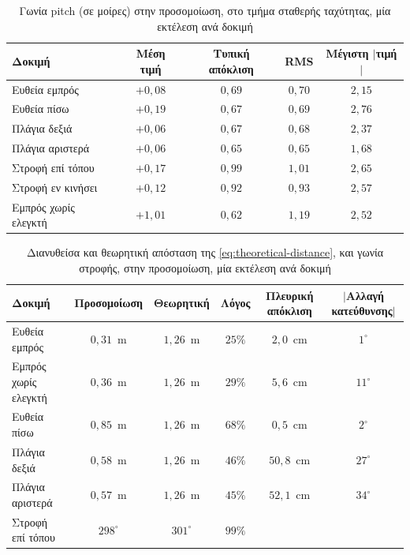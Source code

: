 \documentclass[11pt]{report}
\begin{document}
\begin{table}[htbp]
    \centering
    \small
    \begin{tabular}{@{}l c c c c@{}}
        \toprule
        Δοκιμή & Μέση τιμή & Τυπική απόκλιση & RMS & Μέγιστη $|$τιμή$|$ \\
        \midrule
        Ευθεία εμπρός & $+0{,}08$ & $0{,}69$ & $0{,}70$ & $2{,}15$ \\
        Ευθεία πίσω & $+0{,}19$ & $0{,}67$ & $0{,}69$ & $2{,}76$ \\
        Πλάγια δεξιά & $+0{,}06$ & $0{,}67$ & $0{,}68$ & $2{,}37$ \\
        Πλάγια αριστερά & $+0{,}06$ & $0{,}65$ & $0{,}65$ & $1{,}68$ \\
        Στροφή επί τόπου & $+0{,}17$ & $0{,}99$ & $1{,}01$ & $2{,}65$ \\
        Στροφή εν κινήσει & $+0{,}12$ & $0{,}92$ & $0{,}93$ & $2{,}57$ \\
        Εμπρός χωρίς ελεγκτή & $+1{,}01$ & $0{,}62$ & $1{,}19$ & $2{,}52$ \\
        \bottomrule
    \end{tabular}
    \caption[Γωνία pitch στην προσομοίωση]{Γωνία pitch (σε μοίρες) στην
    προσομοίωση, στο τμήμα σταθερής ταχύτητας, μία εκτέλεση ανά δοκιμή}
    \label{tab:sim-pitch}
\end{table}

\begin{table}[htbp]
    \centering
    \small
    \begin{tabular}{@{}l c c c c c@{}}
        \toprule
        Δοκιμή & Προσομοίωση & Θεωρητική & Λόγος & Πλευρική απόκλιση & $|$Αλλαγή κατεύθυνσης$|$ \\
        \midrule
        Ευθεία εμπρός & $0{,}31$~m & $1{,}26$~m & $25\%$ & $2{,}0$~cm & $1^\circ$ \\
        Εμπρός χωρίς ελεγκτή & $0{,}36$~m & $1{,}26$~m & $29\%$ & $5{,}6$~cm & $11^\circ$ \\
        Ευθεία πίσω & $0{,}85$~m & $1{,}26$~m & $68\%$ & $0{,}5$~cm & $2^\circ$ \\
        Πλάγια δεξιά & $0{,}58$~m & $1{,}26$~m & $46\%$ & $50{,}8$~cm & $27^\circ$ \\
        Πλάγια αριστερά & $0{,}57$~m & $1{,}26$~m & $45\%$ & $52{,}1$~cm & $34^\circ$ \\
        Στροφή επί τόπου & $298^\circ$ & $301^\circ$ & $99\%$ & & \\
        \bottomrule
    \end{tabular}
    \caption[Διανυθείσα απόσταση και γωνία στροφής στην προσομοίωση]{Διανυθείσα
    και θεωρητική απόσταση της \eqref{eq:theoretical-distance}, και γωνία
    στροφής, στην προσομοίωση, μία εκτέλεση ανά δοκιμή}
    \label{tab:sim-distance}
\end{table}
\end{document}
